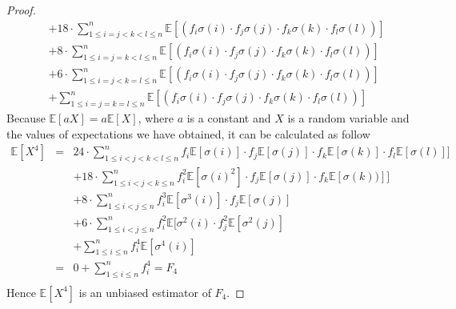 \begin{proof}
\begin{eqnarray*}
					&& +18\cdot\sum_{1 \leq i = j < k < l \leq n}^n\mathbb{E}[(f_i \sigma(i) \cdot f_j \sigma(j) \cdot f_k \sigma(k) \cdot f_l \sigma(l))]\\
					&& +8\cdot\sum_{1 \leq i = j = k < l \leq n}^n\mathbb{E}[(f_i \sigma(i) \cdot f_j \sigma(j) \cdot f_k \sigma(k) \cdot f_l \sigma(l))]\\
					&& +6\cdot\sum_{1 \leq i = j < k = l \leq n}^n\mathbb{E}[(f_i \sigma(i) \cdot f_j \sigma(j) \cdot f_k \sigma(k) \cdot f_l \sigma(l))]\\
					&&+ \sum_{1 \leq i = j = k = l \leq n}^n\mathbb{E}[(f_i \sigma(i) \cdot f_j \sigma(j) \cdot f_k \sigma(k) \cdot f_l \sigma(l))]
				\end{eqnarray*}
				Because $\mathbb{E}[aX] = a\mathbb{E}[X]$, where $a$ is a constant and $X$ is a random variable and the values of expectations we have obtained, it can be calculated as follow
				\begin{eqnarray*}
					\mathbb{E}[X^4]&= &24\cdot\sum_{1 \leq i< j < k < l \leq n}^nf_i\mathbb{E}[\sigma(i)] \cdot f_j\mathbb{E}[\sigma(j)] \cdot f_k\mathbb{E}[ \sigma(k)] \cdot f_l\mathbb{E}[ \sigma(l)]]\\
					&& +18\cdot\sum_{1 \leq i < j < k \leq n}^n f_i^2\mathbb{E}[\sigma(i)^2] \cdot f_j\mathbb{E}[\sigma(j)] \cdot f_k\mathbb{E}[\sigma(k))]]\\
					&& +8\cdot\sum_{1 \leq i < j \leq n}^n f_i^3\mathbb{E}[\sigma^3(i)] \cdot f_j\mathbb{E}[\sigma(j)]\\
					&& +6\cdot\sum_{1 \leq i < j \leq n}^n f_i^2\mathbb{E}[\sigma^2(i) \cdot f_j^2\mathbb{E}[\sigma^2(j)]\\
					&&+ \sum_{1 \leq i \leq n}^n f_i^4\mathbb{E}[\sigma^4(i)]\\
					&= &0 + \sum_{1 \leq i \leq n}^n f_i^4 = F_4\\
				\end{eqnarray*}
			Hence $\mathbb{E}[X^4]$ is an unbiased estimator of $F_4$.
			\end{proof}